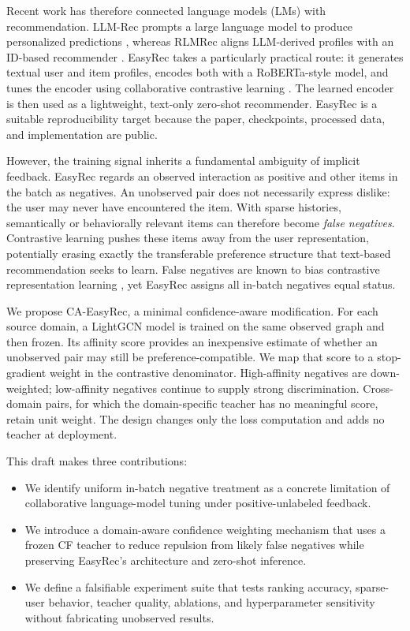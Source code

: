 \documentclass[11pt]{article}
\newcommand{\method}{CA-EasyRec}
\begin{document}
Recent work has therefore connected language models (LMs) with recommendation.
LLM-Rec prompts a large language model to produce personalized predictions \citep{lyu-etal-2024-llm}, whereas RLMRec aligns LLM-derived profiles with an ID-based recommender \citep{ren2024rlmrec}.
EasyRec takes a particularly practical route: it generates textual user and item profiles, encodes both with a RoBERTa-style model, and tunes the encoder using collaborative contrastive learning \citep{ren-huang-2025-easyrec}.
The learned encoder is then used as a lightweight, text-only zero-shot recommender.
EasyRec is a suitable reproducibility target because the paper, checkpoints, processed data, and implementation are public.

However, the training signal inherits a fundamental ambiguity of implicit feedback.
EasyRec regards an observed interaction as positive and other items in the batch as negatives.
An unobserved pair does not necessarily express dislike: the user may never have encountered the item.
With sparse histories, semantically or behaviorally relevant items can therefore become \emph{false negatives}.
Contrastive learning pushes these items away from the user representation, potentially erasing exactly the transferable preference structure that text-based recommendation seeks to learn.
False negatives are known to bias contrastive representation learning \citep{chuang2020debiased,robinson2021hard}, yet EasyRec assigns all in-batch negatives equal status.

We propose \method, a minimal confidence-aware modification.
For each source domain, a LightGCN model \citep{he2020lightgcn} is trained on the same observed graph and then frozen.
Its affinity score provides an inexpensive estimate of whether an unobserved pair may still be preference-compatible.
We map that score to a stop-gradient weight in the contrastive denominator.
High-affinity negatives are down-weighted; low-affinity negatives continue to supply strong discrimination.
Cross-domain pairs, for which the domain-specific teacher has no meaningful score, retain unit weight.
The design changes only the loss computation and adds no teacher at deployment.

This draft makes three contributions:
\begin{itemize}
    \item We identify uniform in-batch negative treatment as a concrete limitation of collaborative language-model tuning under positive-unlabeled feedback.
    \item We introduce a domain-aware confidence weighting mechanism that uses a frozen CF teacher to reduce repulsion from likely false negatives while preserving EasyRec's architecture and zero-shot inference.
    \item We define a falsifiable experiment suite that tests ranking accuracy, sparse-user behavior, teacher quality, ablations, and hyperparameter sensitivity without fabricating unobserved results.
\end{itemize}
\end{document}
